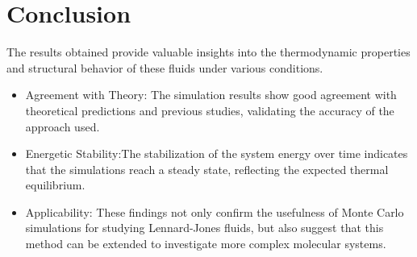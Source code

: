 \documentclass[a4paper,12pt]{article}
\begin{document}
\section{Conclusion}
The results obtained provide valuable insights into the thermodynamic properties and structural behavior of these fluids under various conditions.
\begin{multicols}{2}
  
    \begin{itemize}
        \item Agreement with Theory: The simulation results show good agreement with theoretical predictions and previous studies, validating the accuracy of the approach used.
        \item Energetic Stability:The stabilization of the system energy over time indicates that the simulations reach a steady state, reflecting the expected thermal equilibrium.
        \item  Applicability: These findings not only confirm the usefulness of Monte Carlo simulations for studying Lennard-Jones fluids, but also suggest that this method can be extended to investigate more complex molecular systems.
    \end{itemize}
\end{multicols}

\newpage 


\end{document}
